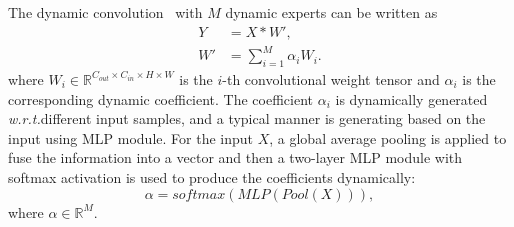 \documentclass{article}
\newcommand{\wrt}{\emph{w.r.t.}}
\begin{document}
The dynamic convolution~\cite{dynamic-conv} with $M$ dynamic experts can be written as
\begin{equation}
	\begin{aligned}
		Y &= X * W',\\
		W' &= \sum_{i=1}^{M}\alpha_iW_i.
	\end{aligned}
\end{equation}
where $W_i\in\mathbb{R}^{C_{out}\times C_{in}\times H\times W}$ is the $i$-th convolutional weight tensor and $\alpha_i$ is the corresponding dynamic coefficient. The coefficient $\alpha_i$ is dynamically generated \wrt different input samples, and a typical manner is generating based on the input using MLP module. For the input $X$, a global average pooling is applied to fuse the information into a vector and then a two-layer MLP module with softmax activation is used to produce the coefficients dynamically:
\begin{equation}
	\alpha = \textit{softmax}(\textit{MLP}(\textit{Pool}(X))),
\end{equation}
where $\alpha\in\mathbb{R}^{M}$. 
\end{document}
